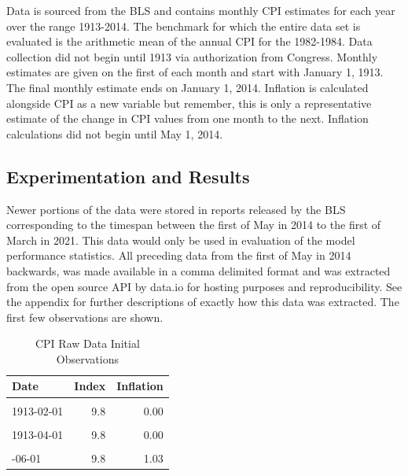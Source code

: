 \documentclass[
]{article}
\begin{document}
Data is sourced from the BLS and contains monthly CPI estimates for each
year over the range 1913-2014. The benchmark for which the entire data
set is evaluated is the arithmetic mean of the annual CPI for the
1982-1984. Data collection did not begin until 1913 via authorization
from Congress. Monthly estimates are given on the first of each month
and start with January 1, 1913. The final monthly estimate ends on
January 1, 2014. Inflation is calculated alongside CPI as a new variable
but remember, this is only a representative estimate of the change in
CPI values from one month to the next. Inflation calculations did not
begin until May 1, 2014.

\hypertarget{experimentation-and-results}{%
\subsection{Experimentation and
Results}\label{experimentation-and-results}}

Newer portions of the data were stored in reports released by the BLS
corresponding to the timespan between the first of May in 2014 to the
first of March in 2021. This data would only be used in evaluation of
the model performance statistics. All preceding data from the first of
May in 2014 backwards, was made available in a comma delimited format
and was extracted from the open source API by data.io for hosting
purposes and reproducibility. See the appendix for further descriptions
of exactly how this data was extracted. The first few observations are
shown.

\begin{table}[!h]

\caption{\label{tab:unnamed-chunk-3}CPI Raw Data Initial Observations}
\centering
\begin{tabular}[t]{lrr}
\toprule
Date & Index & Inflation\\
\midrule
\cellcolor{gray!6}{1913-01-01} & \cellcolor{gray!6}{9.8} & \cellcolor{gray!6}{NA}\\
1913-02-01 & 9.8 & 0.00\\
\cellcolor{gray!6}{1913-03-01} & \cellcolor{gray!6}{9.8} & \cellcolor{gray!6}{0.00}\\
1913-04-01 & 9.8 & 0.00\\
\cellcolor{gray!6}{1913-05-01} & \cellcolor{gray!6}{9.7} & \cellcolor{gray!6}{-1.02}\\
\addlinespace
1913-06-01 & 9.8 & 1.03\\
\bottomrule
\end{tabular}
\end{table}
\end{document}
